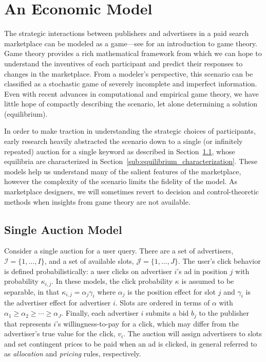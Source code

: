 \documentclass[prodmode,acmtist]{acmsmall} %
\begin{document}

\section{An Economic Model} %
\label{sec:auction_and_marketplace_design}

The strategic interactions between publishers and advertisers in a paid search marketplace can be modeled as a game---see  for an introduction to game theory.
Game theory provides a rich mathematical framework from which we can hope to understand the inventives of each participant and predict their responses to changes in the marketplace.
From a modeler's perspective, this scenario can be classified as a stochastic game of severely incomplete and imperfect information.
Even with recent advances in computational and empirical game theory, we have little hope of compactly describing the scenario, let alone determining a solution (equilibrium).


In order to make traction in understanding the strategic choices of participants, early research heavily abstracted the scenario down to a single (or infinitely repeated) auction for a single keyword as described in Section~\ref{sub:single_auction_model}, whose equilibria are characterized in Section~\ref{sub:equilibrium_characterization}. 
These models help us understand many of the salient features of the marketplace, however the complexity of the scenario limits the fidelity of the model.
As marketplace designers, we will sometimes revert to decision and control-theoretic methods when insights from game theory are not available.


\subsection{Single Auction Model} %
\label{sub:single_auction_model}

Consider a single auction for a user query. 
There are a set of advertisers, $\mathcal{I} = \{1,\ldots,I\}$, and a set of available slots, $\mathcal{J} = \{1, \ldots, J\}$.  
The user's click behavior is defined probabilistically: a user clicks on advertiser $i$'s ad in position $j$ with probability $\kappa_{i,j}$.  
In these models, the click probability $\kappa$ is assumed to be separable, in that $\kappa_{i,j} = \alpha_j\gamma_i$ where $\alpha_j$ is the position effect for slot $j$ and $\gamma_i$ is the advertiser effect for advertiser $i$.  
Slots are ordered in terms of $\alpha$ with $\alpha_1 \ge \alpha_2 \ge \cdots \ge \alpha_{J}$.    
Finally, each advertiser $i$ submits a bid $b_j$ to the publisher that represents $i$'s willingness-to-pay for a click, which may differ from the advertiser's true value for the click, $v_i$. 
The auction will assign advertisers to slots and set contingent prices to be paid when an ad is clicked, in general referred to as \emph{allocation} and \emph{pricing} rules, respectively.
\end{document}

